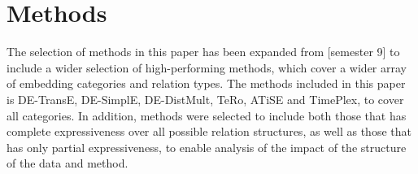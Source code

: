 \section{Methods}
\label{sec:methods}

The selection of methods in this paper has been expanded from [semester 9] to include a wider selection of high-performing methods, which cover a wider array of embedding categories and relation types. The methods included in this paper is DE-TransE, DE-SimplE, DE-DistMult, TeRo, ATiSE and TimePlex, to cover all categories. In addition, methods were selected to include both those that has complete expressiveness over all possible relation structures, as well as those that has only partial expressiveness, to enable analysis of the impact of the structure of the data and method. 

